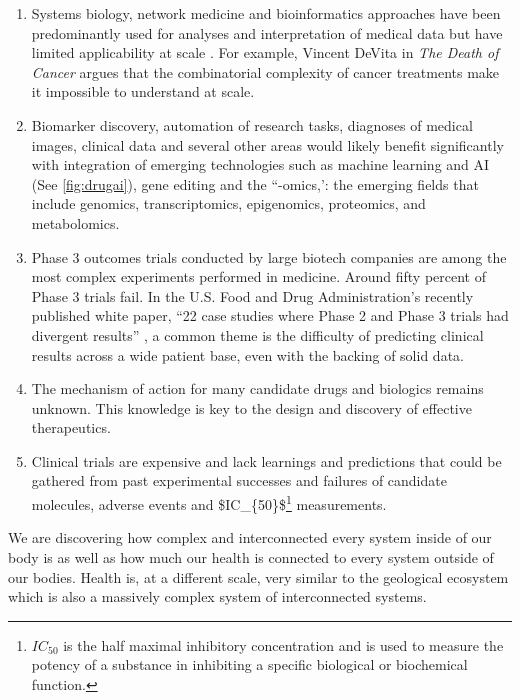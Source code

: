 \begin{enumerate}
\item Systems biology, network medicine and bioinformatics approaches have been predominantly used for analyses and interpretation of medical data but have limited applicability at scale \cite{devita2015death}. For example, Vincent DeVita in \textit{The Death of Cancer} argues that the combinatorial complexity of cancer treatments make it impossible to understand at scale.
\item Biomarker discovery, automation of research tasks, diagnoses of medical images, clinical data and several other areas would likely benefit significantly with integration of emerging technologies such as machine learning and \ac{AI} (See \autoref{fig:drugai}), gene editing and the ``-omics,': the emerging fields that include genomics, transcriptomics, epigenomics, proteomics, and metabolomics.
\item Phase 3 outcomes trials conducted by large biotech companies are among the most complex experiments performed in medicine. Around fifty percent of Phase 3 trials fail. In the U.S. Food and Drug Administration's recently published white paper, ``22 case studies where Phase 2 and Phase 3 trials had divergent results'' \cite{22CaseSt45:online}, a common theme is the difficulty of predicting clinical results across a wide patient base, even with the backing of solid data. 
\item The mechanism of action for many candidate drugs and biologics remains unknown. This knowledge is key to the design and discovery of effective therapeutics.
\item Clinical trials are expensive and lack learnings and predictions that could be gathered from past experimental successes and failures of candidate molecules, adverse events and \ac{$IC_{50}$}\footnote{$IC_{50}$ is the half maximal inhibitory concentration and is used to measure the potency of a substance in inhibiting a specific biological or biochemical function.} measurements.
\end{enumerate}


We are discovering how complex and interconnected every system inside of our body is as well as how much our health is connected to every system outside of our bodies. Health is, at a different scale, very similar to the geological ecosystem which is also a massively complex system of interconnected systems.


